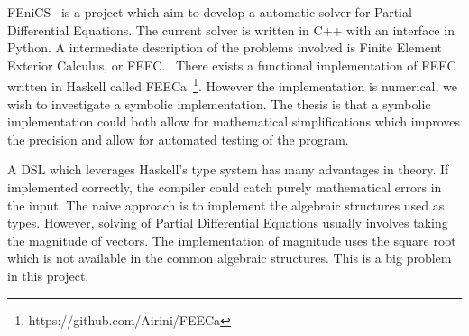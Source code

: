 \documentclass{scrartcl}
\begin{document}
FEniCS~\cite{AlnaesBlechta2015a} is a project which aim to develop a automatic
solver for Partial Differential Equations. The current solver is written in C++
with an interface in Python. A intermediate description of the problems
involved is Finite Element Exterior Calculus, or FEEC.~\cite{arnold2006finite}
There exists a functional implementation of FEEC written in Haskell called
FEECa~\footnote{https://github.com/Airini/FEECa}.  However the implementation
is numerical, we wish to investigate a symbolic implementation.  The thesis is
that a symbolic implementation could both allow for mathematical
simplifications which improves the precision and allow for automated testing of
the program.






A DSL which leverages Haskell's type system has many advantages in theory. If
implemented correctly, the compiler could catch purely mathematical errors in
the input. The naive approach is to implement the algebraic structures used
as types. However, solving of Partial Differential Equations usually involves
taking the magnitude of vectors. The implementation of magnitude uses the
square root which is not available in the common algebraic structures. This is
a big problem in this project.
\end{document}

